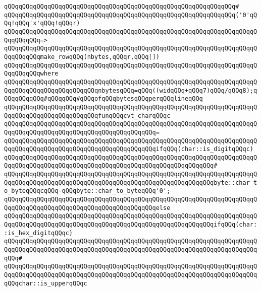 \verb|qQQqqQQqqQQqqQQqqQQqqQQqqQQqqQQqqQQqqQQqqQQqqQQqqQQqqQQqqQQqqQQq#|\newline
\verb|qQQqqQQqqQQqqQQqqQQqqQQqqQQqqQQqqQQqqQQqqQQqqQQqqQQqqQQqqQQqqQQq('0'qQQq!qQQq'x'qQQq!qQQqr)|\newline
\verb|qQQqqQQqqQQqqQQqqQQqqQQqqQQqqQQqqQQqqQQqqQQqqQQqqQQqqQQqqQQqqQQqqQQqqQQqqQQqqQQq=>|\newline
\verb|qQQqqQQqqQQqqQQqqQQqqQQqqQQqqQQqqQQqqQQqqQQqqQQqqQQqqQQqqQQqqQQqqQQqqQQqqQQqqQQqmake_rowqQQq(nbytes,qQQqr,qQQq[])|\newline
\verb|qQQqqQQqqQQqqQQqqQQqqQQqqQQqqQQqqQQqqQQqqQQqqQQqqQQqqQQqqQQqqQQqqQQqqQQqqQQqqQQqwhere|\newline
\verb|qQQqqQQqqQQqqQQqqQQqqQQqqQQqqQQqqQQqqQQqqQQqqQQqqQQqqQQqqQQqqQQqqQQqqQQqqQQqqQQqqQQqqQQqqQQqqQQqnbytesqQQq=qQQq((widqQQq+qQQq7)qQQq/qQQq8);qQQqqQQqqQQq#qQQqqQQq#qQQqofqQQqbytesqQQqperqQQqlineqQQq|\newline
\newline
\verb|qQQqqQQqqQQqqQQqqQQqqQQqqQQqqQQqqQQqqQQqqQQqqQQqqQQqqQQqqQQqqQQqqQQqqQQqqQQqqQQqqQQqqQQqqQQqqQQqfunqQQqcvt_charqQQqc|\newline
\verb|qQQqqQQqqQQqqQQqqQQqqQQqqQQqqQQqqQQqqQQqqQQqqQQqqQQqqQQqqQQqqQQqqQQqqQQqqQQqqQQqqQQqqQQqqQQqqQQqqQQqqQQqqQQqqQQq=|\newline
\verb|qQQqqQQqqQQqqQQqqQQqqQQqqQQqqQQqqQQqqQQqqQQqqQQqqQQqqQQqqQQqqQQqqQQqqQQqqQQqqQQqqQQqqQQqqQQqqQQqqQQqqQQqqQQqqQQqifqQQq(char::is_digitqQQqc)|\newline
\verb|qQQqqQQqqQQqqQQqqQQqqQQqqQQqqQQqqQQqqQQqqQQqqQQqqQQqqQQqqQQqqQQqqQQqqQQqqQQqqQQqqQQqqQQqqQQqqQQqqQQqqQQqqQQqqQQqqQQqqQQqqQQqqQQq#|\newline
\verb|qQQqqQQqqQQqqQQqqQQqqQQqqQQqqQQqqQQqqQQqqQQqqQQqqQQqqQQqqQQqqQQqqQQqqQQqqQQqqQQqqQQqqQQqqQQqqQQqqQQqqQQqqQQqqQQqqQQqqQQqqQQqqQQqbyte::char_to_byteqQQqcqQQq-qQQqbyte::char_to_byteqQQq'0';|\newline
\verb|qQQqqQQqqQQqqQQqqQQqqQQqqQQqqQQqqQQqqQQqqQQqqQQqqQQqqQQqqQQqqQQqqQQqqQQqqQQqqQQqqQQqqQQqqQQqqQQqqQQqqQQqqQQqqQQqelse|\newline
\verb|qQQqqQQqqQQqqQQqqQQqqQQqqQQqqQQqqQQqqQQqqQQqqQQqqQQqqQQqqQQqqQQqqQQqqQQqqQQqqQQqqQQqqQQqqQQqqQQqqQQqqQQqqQQqqQQqqQQqqQQqqQQqqQQqifqQQq(char::is_hex_digitqQQqc)|\newline
\verb|qQQqqQQqqQQqqQQqqQQqqQQqqQQqqQQqqQQqqQQqqQQqqQQqqQQqqQQqqQQqqQQqqQQqqQQqqQQqqQQqqQQqqQQqqQQqqQQqqQQqqQQqqQQqqQQqqQQqqQQqqQQqqQQqqQQqqQQqqQQqqQQq#|\newline
\verb|qQQqqQQqqQQqqQQqqQQqqQQqqQQqqQQqqQQqqQQqqQQqqQQqqQQqqQQqqQQqqQQqqQQqqQQqqQQqqQQqqQQqqQQqqQQqqQQqqQQqqQQqqQQqqQQqqQQqqQQqqQQqqQQqqQQqqQQqqQQqqQQqchar::is_upperqQQqc|\newline
